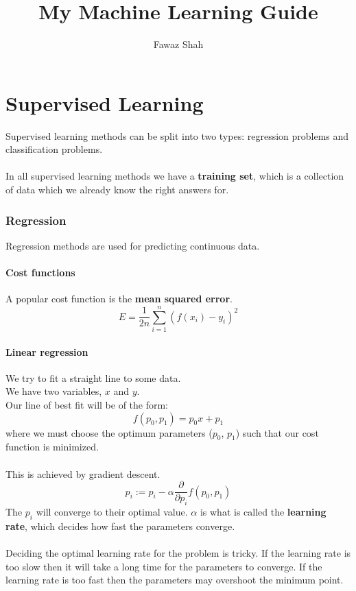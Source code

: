 \documentclass{scrartcl}
\title{My Machine Learning Guide}
\subtitle{}
\date{}
\author{Fawaz Shah}
\begin{document}
\large
\maketitle
\tableofcontents
\newpage

\part{Supervised Learning}

Supervised learning methods can be split into two types: regression problems and classification problems.
\\\\
In all supervised learning methods we have a \textbf{training set}, which is a collection of data which we already know the right answers for.

\section{Regression}

Regression methods are used for predicting continuous data.

\subsection{Cost functions}

A popular cost function is the \textbf{mean squared error}.
\begin{equation}
E = \frac{1}{2n} \sum^{n}_{i = 1} (f(x_{i}) - y_{i})^{2}
\end{equation}

\subsection{Linear regression}

We try to fit a straight line to some data.\\
We have two variables, $ x $ and $ y $.\\
Our line of best fit will be of the form:
\begin{equation}
f(p_{0}, p_{1}) = p_{0}x + p_{1}
\end{equation}
where we must choose the optimum parameters ($ p_{0} $, $ p_{1} $) such that our cost function is minimized.
\\\\
This is achieved by gradient descent.
\begin{equation}
p_{i} := p_{i} - \alpha \frac{\partial}{\partial p_{i}} f(p_{0}, p_{1})
\end{equation}
The $ p_{i} $ will converge to their optimal value. $ \alpha $ is what is called the \textbf{learning rate}, which decides how fast the parameters converge.
\\\\
Deciding the optimal learning rate for the problem is tricky. If the learning rate is too slow then it will take a long time for the parameters to converge. If the learning rate is too fast then the parameters may overshoot the minimum point.
\end{document}
